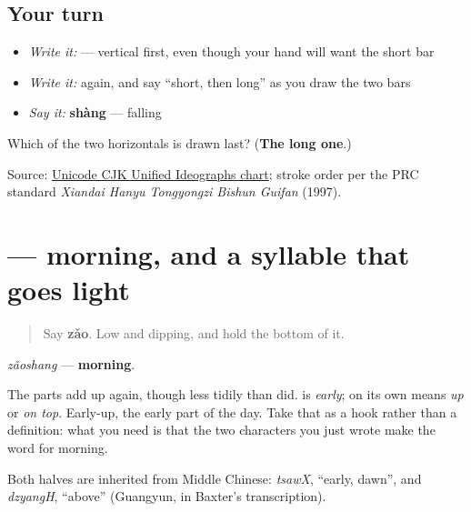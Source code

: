 \subsection*{Your turn}
\begin{itemize}
\raggedright
  \item \emph{Write it:}  — vertical first, even though your hand will want the short bar
  \item \emph{Write it:}  again, and say \textquotedblleft{}short, then long\textquotedblright{} as you draw the two bars
  \item \emph{Say it:} \textbf{shàng} — falling
\end{itemize}

\begin{tcolorbox}[breakable,colback=teal!4,colframe=teal!35!black,title={Before you move on}]
Which of the two horizontals is drawn last? (\textbf{The long one}.)

Source: \href{https://www.unicode.org/charts/PDF/U4E00.pdf}{Unicode CJK Unified Ideographs chart}; stroke order per the PRC standard \emph{Xiandai Hanyu Tongyongzi Bishun Guifan} (1997).
\end{tcolorbox}
\section[\texorpdfstring{\zh{早上} (zǎoshang)}{早上 (zǎoshang)}]{ — morning, and a syllable that goes light}

\label{lesson:ZH-C07-zaoshang}



\begin{quote}
Say \textbf{zǎo}. Low and dipping, and hold the bottom of it.
\end{quote}

\begin{cousinweb}
\begin{quote}
\end{quote}

\textbf{} \emph{zǎoshang} — \textbf{morning}.

The parts add up again, though less tidily than  did. \textbf{} is \emph{early}; \textbf{} on its own means \emph{up} or \emph{on top}. Early-up, the early part of the day. Take that as a hook rather than a definition: what you need is that the two characters you just wrote make the word for morning.

Both halves are inherited from Middle Chinese: \emph{tsawX}, \textquotedblleft{}early, dawn\textquotedblright{}, and \emph{dzyangH}, \textquotedblleft{}above\textquotedblright{} (Guangyun, in Baxter's transcription).
\end{cousinweb}

